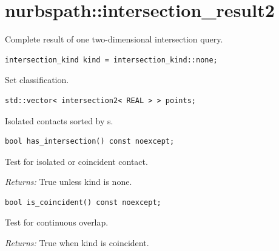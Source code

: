 \section{nurbspath::intersection\_result2}
Complete result of one two-dimensional intersection query.
\par\noindent\begin{minipage}{\linewidth}
\begin{lstlisting}[style=apireference]
intersection_kind kind = intersection_kind::none;
\end{lstlisting}
{\footnotesize Set classification.\par}
\end{minipage}\par\vspace{1pt}
\par\noindent\begin{minipage}{\linewidth}
\begin{lstlisting}[style=apireference]
std::vector< intersection2< REAL > > points;
\end{lstlisting}
{\footnotesize Isolated contacts sorted by s.\par}
\end{minipage}\par\vspace{1pt}
\par\noindent\begin{minipage}{\linewidth}
\begin{lstlisting}[style=apireference]
bool has_intersection() const noexcept;
\end{lstlisting}
{\footnotesize Test for isolated or coincident contact.\par}
{\footnotesize\textit{Returns:} True unless kind is none.\par}
\end{minipage}\par\vspace{1pt}
\par\noindent\begin{minipage}{\linewidth}
\begin{lstlisting}[style=apireference]
bool is_coincident() const noexcept;
\end{lstlisting}
{\footnotesize Test for continuous overlap.\par}
{\footnotesize\textit{Returns:} True when kind is coincident.\par}
\end{minipage}\par\vspace{1pt}
